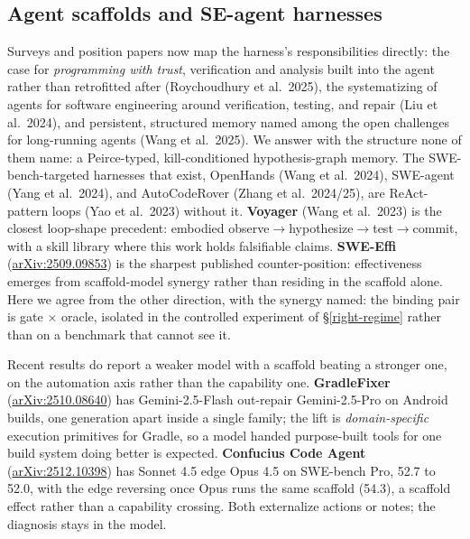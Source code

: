 \documentclass[
  10pt,
]{article}
\newcounter{none} %
\begin{document}
\subsection{Agent scaffolds and SE-agent harnesses}\label{rw-scaffolds}

Surveys and position papers now map the harness's responsibilities
directly: the case for \emph{programming with trust}, verification and
analysis built into the agent rather than retrofitted after
(Roychoudhury et al.~2025), the systematizing of agents for software
engineering around verification, testing, and repair (Liu et al.~2024),
and persistent, structured memory named among the open challenges for
long-running agents (Wang et al.~2025). We answer with the structure
none of them name: a Peirce-typed, kill-conditioned hypothesis-graph
memory. The SWE-bench-targeted harnesses that exist, OpenHands (Wang et
al.~2024), SWE-agent (Yang et al.~2024), and AutoCodeRover (Zhang et
al.~2024/25), are ReAct-pattern loops (Yao et al.~2023) without it.
\textbf{Voyager} (Wang et al.~2023) is the closest loop-shape precedent:
embodied
observe\(\rightarrow\)hypothesize\(\rightarrow\)test\(\rightarrow\)commit,
with a skill library where this work holds falsifiable claims.
\textbf{SWE-Effi}
(\href{https://arxiv.org/abs/2509.09853}{arXiv:2509.09853}) is the
sharpest published counter-position: effectiveness emerges from
scaffold-model synergy rather than residing in the scaffold alone. Here
we agree from the other direction, with the synergy named: the binding
pair is gate \(\times\) oracle, isolated in the controlled experiment of
\S\ref{right-regime} rather than on a benchmark that cannot see it.

Recent results do report a weaker model with a scaffold beating a
stronger one, on the automation axis rather than the capability one.
\textbf{GradleFixer}
(\href{https://arxiv.org/abs/2510.08640}{arXiv:2510.08640}) has
Gemini-2.5-Flash out-repair Gemini-2.5-Pro on Android builds, one
generation apart inside a single family; the lift is
\emph{domain-specific} execution primitives for Gradle, so a model
handed purpose-built tools for one build system doing better is
expected. \textbf{Confucius Code Agent}
(\href{https://arxiv.org/abs/2512.10398}{arXiv:2512.10398}) has Sonnet
4.5 edge Opus 4.5 on SWE-bench Pro, 52.7 to 52.0, with the edge
reversing once Opus runs the same scaffold (54.3), a scaffold effect
rather than a capability crossing. Both externalize actions or notes;
the diagnosis stays in the model.
\end{document}
